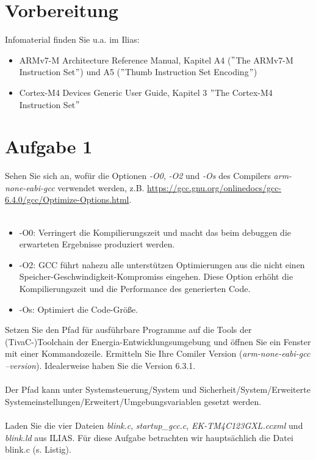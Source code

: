 \newpage
\section{Vorbereitung}
Infomaterial finden Sie u.a. im Ilias:
\begin{itemize}
	\item ARMv7-M Architecture Reference Manual, Kapitel A4 ($"$The ARMv7-M Instruction Set$"$) und A5 ($"$Thumb Instruction Set Encoding$"$)
	\item Cortex-M4 Devices Generic User Guide, Kapitel 3 $"$The Cortex-M4 Instruction Set$"$
\end{itemize}
\section{Aufgabe 1}
Sehen Sie sich an, wofür die Optionen \textit{-O0}, \textit{-O2} und \textit{-Os} des Compilers \textit{arm-none-eabi-gcc} verwendet werden, z.B. \url{https://gcc.gnu.org/onlinedocs/gcc-6.4.0/gcc/Optimize-Options.html}.\\ \\
\begin{itemize}
	\item -O0: Verringert die Kompilierungszeit und macht das beim debuggen die erwarteten Ergebnisse produziert werden.
	\item -O2: GCC führt nahezu alle unterstützen Optimierungen aus die nicht einen Speicher-Geschwindigkeit-Kompromiss eingehen. Diese Option erhöht die Kompilierungszeit und die Performance des generierten Code.
	\item -Os: Optimiert die Code-Grö\ss{}e.
\end{itemize}
Setzen Sie den Pfad für ausführbare Programme auf die Tools der (TivaC-)Toolchain der Energia-Entwicklungsumgebung und öffnen Sie ein Fenster mit einer Kommandozeile. Ermitteln Sie Ihre Comiler Version (\textit{arm-none-eabi-gcc --version}). Idealerweise haben Sie die Version 6.3.1.\\ \\
Der Pfad kann unter Systemsteuerung/System und Sicherheit/System/Erweiterte Systemeinstellungen/Erweitert/Umgebungsvariablen gesetzt werden.\\ \\
Laden Sie die vier Dateien \textit{blink.c}, \textit{startup\_gcc.c}, \textit{EK-TM4C123GXL.ccxml} und \textit{blink.ld} aus ILIAS. Für diese Aufgabe betrachten wir hauptsächlich die Datei blink.c (s. Listig).\\ \\
